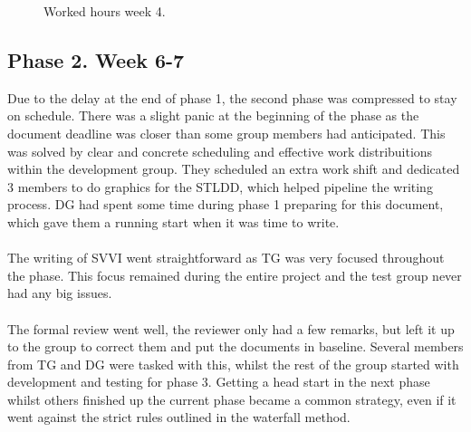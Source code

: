 \documentclass{article}
\begin{document}
\begin{figure}[!htb]
              \caption{Worked hours week 4.}\label{fig:week5}
            \endminipage
        \end{figure}

    \subsection{Phase 2. Week 6-7 \label{phase2}}
        Due to the delay at the end of phase 1, the second phase was compressed to stay on schedule. 
        There was a slight panic at the beginning of the phase as the document deadline was closer than some group 
        members had anticipated. This was solved by clear and concrete scheduling and effective work distribuitions within the development group. They scheduled an extra work shift and dedicated 3 members to do graphics for
        the STLDD, which helped pipeline the writing process. DG had spent some time during phase 1 preparing for 
        this document, which gave them a running start when it was time to write.
        \\ \\
        The writing of SVVI went straightforward as TG was very focused throughout the phase. This focus remained
        during the entire project and the test group never had any big issues.
        \\ \\
        The formal review went well, the reviewer only had a few remarks, but left it up to the group to correct them and put the documents in baseline.
        Several members from TG and DG were tasked with this, whilst the rest of the group
        started with development and testing for phase 3. Getting a head start in the next phase whilst others finished up the current
        phase became a common strategy, even if it went against the strict rules outlined in the waterfall method.
        
\end{document}
